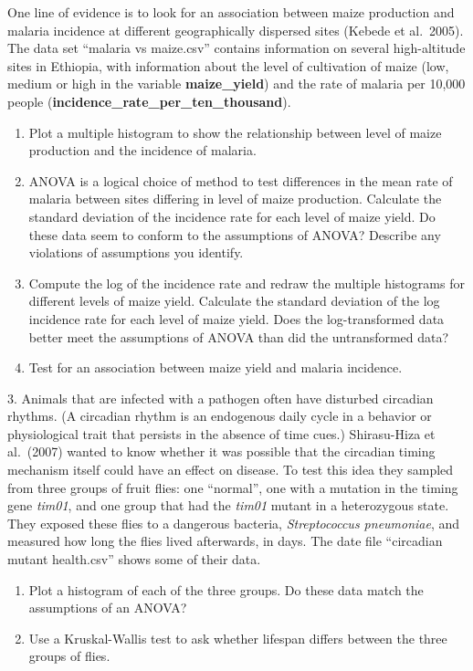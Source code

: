 \documentclass[
]{article}
\begin{document}
One line of evidence is to look for an association between maize
production and malaria incidence at different geographically dispersed
sites (Kebede et al.~2005). The data set ``malaria vs maize.csv''
contains information on several high-altitude sites in Ethiopia, with
information about the level of cultivation of maize (low, medium or high
in the variable \textbf{maize\_yield}) and the rate of malaria per
10,000 people (\textbf{incidence\_rate\_per\_ten\_thousand}).

\begin{enumerate}
\def\labelenumi{\alph{enumi}.}
\item
  Plot a multiple histogram to show the relationship between level of
  maize production and the incidence of malaria.
\item
  ANOVA is a logical choice of method to test differences in the mean
  rate of malaria between sites differing in level of maize production.
  Calculate the standard deviation of the incidence rate for each level
  of maize yield. Do these data seem to conform to the assumptions of
  ANOVA? Describe any violations of assumptions you identify.
\item
  Compute the log of the incidence rate and redraw the multiple
  histograms for different levels of maize yield. Calculate the standard
  deviation of the log incidence rate for each level of maize yield.
  Does the log-transformed data better meet the assumptions of ANOVA
  than did the untransformed data?
\item
  Test for an association between maize yield and malaria incidence.
\end{enumerate}

3. Animals that are infected with a pathogen often have disturbed
circadian rhythms. (A circadian rhythm is an endogenous daily cycle in a
behavior or physiological trait that persists in the absence of time
cues.) Shirasu-Hiza et al.~(2007) wanted to know whether it was possible
that the circadian timing mechanism itself could have an effect on
disease. To test this idea they sampled from three groups of fruit
flies: one ``normal'', one with a mutation in the timing gene
\emph{tim01}, and one group that had the \emph{tim01} mutant in a
heterozygous state. They exposed these flies to a dangerous bacteria,
\emph{Streptococcus pneumoniae}, and measured how long the flies lived
afterwards, in days. The date file ``circadian mutant health.csv'' shows
some of their data.

\begin{enumerate}
\def\labelenumi{\alph{enumi}.}
\item
  Plot a histogram of each of the three groups. Do these data match the
  assumptions of an ANOVA?
\item
  Use a Kruskal-Wallis test to ask whether lifespan differs between the
  three groups of flies.
\end{enumerate}
\end{document}
